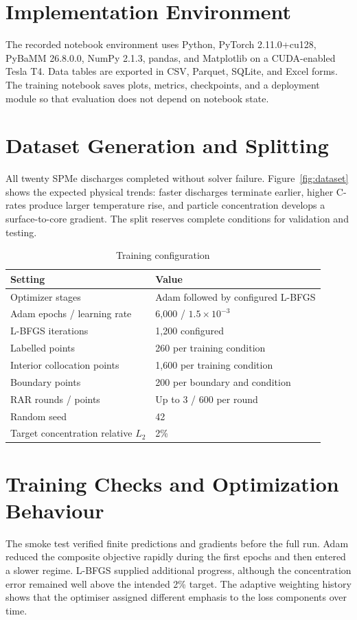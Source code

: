 \documentclass[14pt,a4paper,oneside]{extreport}
\begin{document}
\section{Implementation Environment}
\label{sec:results-first}
The recorded notebook environment uses Python, PyTorch 2.11.0+cu128, PyBaMM 26.8.0.0, NumPy 2.1.3, pandas, and Matplotlib on a CUDA-enabled Tesla T4. Data tables are exported in CSV, Parquet, SQLite, and Excel forms. The training notebook saves plots, metrics, checkpoints, and a deployment module so that evaluation does not depend on notebook state.

\section{Dataset Generation and Splitting}
All twenty SPMe discharges completed without solver failure. Figure~\ref{fig:dataset} shows the expected physical trends: faster discharges terminate earlier, higher C-rates produce larger temperature rise, and particle concentration develops a surface-to-core gradient. The split reserves complete conditions for validation and testing.

\begin{table}[htbp]
\centering
\caption{Training configuration}
\small
\begin{tabularx}{\textwidth}{p{}X}
\toprule
Setting & Value\\
\midrule
Optimizer stages & Adam followed by configured L-BFGS\\
Adam epochs / learning rate & 6,000 / $1.5\times10^{-3}$\\
L-BFGS iterations & 1,200 configured\\
Labelled points & 260 per training condition\\
Interior collocation points & 1,600 per training condition\\
Boundary points & 200 per boundary and condition\\
RAR rounds / points & Up to 3 / 600 per round\\
Random seed & 42\\
Target concentration relative $L_2$ & 2\%\\
\bottomrule
\end{tabularx}
\end{table}

\section{Training Checks and Optimization Behaviour}
The smoke test verified finite predictions and gradients before the full run. Adam reduced the composite objective rapidly during the first epochs and then entered a slower regime. L-BFGS supplied additional progress, although the concentration error remained well above the intended 2\% target. The adaptive weighting history shows that the optimiser assigned different emphasis to the loss components over time.
\end{document}

